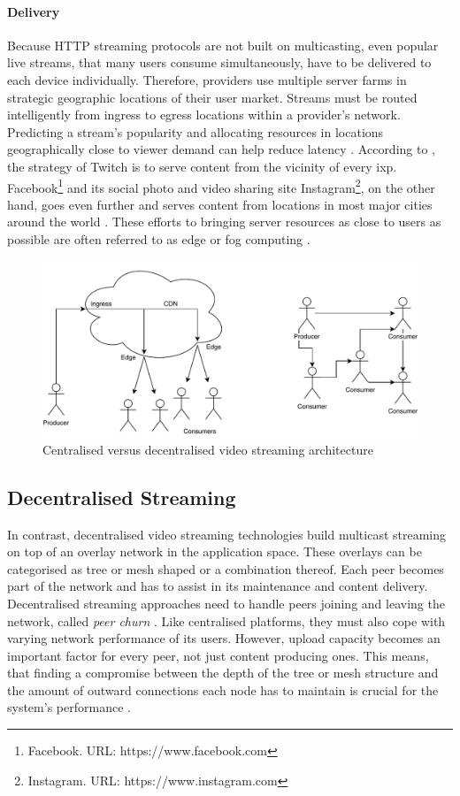 \paragraph{Delivery}
Because HTTP streaming protocols are not built on multicasting, even popular live streams, that many users consume simultaneously, have to be delivered to each device individually. Therefore, providers use multiple server farms \cite[p. 738-740]{tanenbaum_wetherall_2011} in strategic geographic locations of their user market. Streams must be routed intelligently from ingress to egress locations within a provider's network. Predicting a stream's popularity and allocating resources in locations geographically close to viewer demand can help reduce latency \cite{twitch-case}. According to \citet[\S3]{twitch-case}, the strategy of Twitch is to serve content from the vicinity of every \gls{ixp}. Facebook\footnote{Facebook. URL: {https://www.facebook.com}} and its social photo and video sharing site Instagram\footnote{Instagram. URL: {https://www.instagram.com}}, on the other hand, goes even further and serves content from locations in most major cities around the world \cite{facebook-locations}. These efforts to bringing server resources as close to users as possible are often referred to as edge or fog computing \cite{fog-computing, object-store-fog-edge-ipfs}.

\begin{figure}
\centering
\includegraphics[width=.75\textwidth]{graphics/streaming-types.pdf}
\caption{Centralised versus decentralised video streaming architecture}
\label{fig:de-central-architectures}
\end{figure}

\subsection{Decentralised Streaming}

In contrast, decentralised video streaming technologies build multicast streaming on top of an overlay network in the application space. These overlays can be categorised as tree or mesh shaped or a combination thereof. Each peer becomes part of the network and has to assist in its maintenance and content delivery. Decentralised streaming approaches need to handle peers joining and leaving the network, called \textit{peer churn} \cite[\S7.5]{tanenbaum_wetherall_2011}. Like centralised platforms, they must also cope with varying network performance of its users. However, upload capacity becomes an important factor for every peer, not just content producing ones. This means, that finding a compromise between the depth of the tree or mesh structure and the amount of outward connections each node has to maintain is crucial for the system's performance \cite[\S{III.A}]{multicast-problems}.


